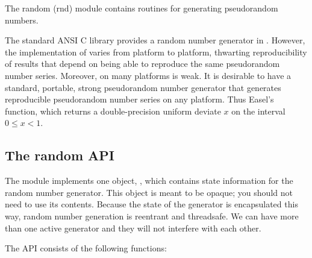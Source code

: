 The random (rnd) module contains routines for generating pseudorandom
numbers.

The standard ANSI C library provides a random number generator in
. However, the implementation of  varies
from platform to platform, thwarting reproducibility of results that
depend on being able to reproduce the same pseudorandom number series.
Moreover, on many platforms  is weak. It is desirable to
have a standard, portable, strong pseudorandom number generator that
generates reproducible pseudorandom number series on any platform.
Thus Easel's  function, which returns a
double-precision uniform deviate $x$ on the interval $0 \leq x < 1$.

\subsection{The random API}

The module implements one object, , which
contains state information for the random number generator.  This
object is meant to be opaque; you should not need to use its contents.
Because the state of the generator is encapsulated this way, random
number generation is reentrant and threadsafe. We can have more than
one active generator and they will not interfere with each other. 

The API consists of the following functions:

